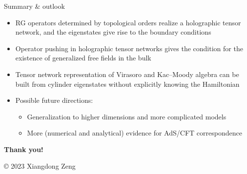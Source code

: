 \documentclass{fdubeamer}
\begin{document}
\begin{frame}{Summary \& outlook}

\begin{itemize}
  \item RG operators determined by topological orders realize a \alert{holographic tensor network}, and the eigenstates give rise to the boundary conditions
  \item Operator pushing in holographic tensor networks gives the condition for the existence of \alert{generalized free fields} in the bulk
  \item Tensor network representation of Virasoro and Kac--Moody algebra can be built from \alert{cylinder eigenstates} without explicitly knowing the Hamiltonian
  \item Possible future directions:

    \begin{itemize}
      \item Generalization to higher dimensions and more complicated models
      \item More (numerical and analytical) evidence for AdS/CFT correspondence
    \end{itemize}
\end{itemize}

\end{frame}

\begingroup
  \begin{frame}[plain]
    \vfill
    \begin{center}
      \color{white}
      \LARGE
      \textbf{Thank you!} \par
      \vspace{6em}
      \tiny
      \copyright{} 2023 Xiangdong Zeng
    \end{center}
    \vspace{-8em}
  \end{frame}
\endgroup
\end{document}
